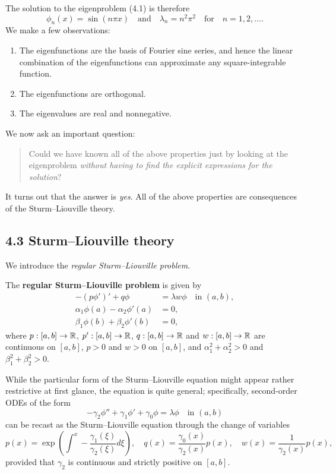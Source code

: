 The solution to the eigenproblem (4.1) is therefore
\[\phi_n(x) = \sin(n\pi x) \quad \text{and} \quad \lambda_n = n^2\pi^2 \quad \text{for} \quad n = 1, 2, \dots.\]
We make a few observations:
\begin{enumerate}
    \item The eigenfunctions are the basis of Fourier sine series, and hence the linear combination of the eigenfunctions can approximate any square-integrable function.
    \item The eigenfunctions are orthogonal.
    \item The eigenvalues are real and nonnegative.
\end{enumerate}
We now ask an important question:
\begin{quote}
    Could we have known all of the above properties just by looking at the eigenproblem \textit{without having to find the explicit expressions for the solution}?
\end{quote}
It turns out that the answer is \textit{yes}. All of the above properties are consequences of the Sturm--Liouville theory.

\subsection{4.3 Sturm--Liouville theory}
We introduce the \textit{regular Sturm--Liouville problem}.

\begin{definition}
    The \textbf{regular Sturm--Liouville problem} is given by
    \begin{align*}
        -(p\phi')' + q\phi &= \lambda w \phi \quad \text{in } (a, b), \\
        \alpha_1 \phi(a) - \alpha_2 \phi'(a) &= 0, \\
        \beta_1 \phi(b) + \beta_2 \phi'(b) &= 0,
    \end{align*}
    where $p : [a, b] \to \mathbb{R}$, $p' : [a, b] \to \mathbb{R}$, $q : [a, b] \to \mathbb{R}$ and $w : [a, b] \to \mathbb{R}$ are continuous on $[a, b]$, $p > 0$ and $w > 0$ on $[a, b]$, and $\alpha_1^2 + \alpha_2^2 > 0$ and $\beta_1^2 + \beta_2^2 > 0$.
\end{definition}

While the particular form of the Sturm--Liouville equation might appear rather restrictive at first glance, the equation is quite general; specifically, second-order ODEs of the form
\[-\gamma_2 \phi'' + \gamma_1 \phi' + \gamma_0 \phi = \lambda \phi \quad \text{in } (a, b)\]
can be recast as the Sturm--Liouville equation through the change of variables
\[p(x) = \exp\left(\int^x -\frac{\gamma_1(\xi)}{\gamma_2(\xi)} d\xi\right), \quad q(x) = \frac{\gamma_0(x)}{\gamma_2(x)} p(x), \quad w(x) = \frac{1}{\gamma_2(x)} p(x),\]
provided that $\gamma_2$ is continuous and strictly positive on $[a, b]$.


